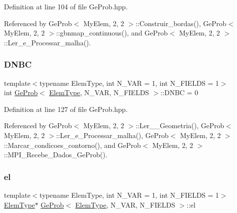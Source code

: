 Definition at line 104 of file Ge\+Prob.\+hpp.



Referenced by Ge\+Prob$<$ My\+Elem, 2, 2 $>$\+::\+Construir\+\_\+bordas(), Ge\+Prob$<$ My\+Elem, 2, 2 $>$\+::gbnmap\+\_\+continuous(), and Ge\+Prob$<$ My\+Elem, 2, 2 $>$\+::\+Ler\+\_\+e\+\_\+\+Processar\+\_\+malha().

\mbox{\label{classGeProb_a416b1ac091d91a8959a4ff2518948466}} 
\subsubsection{\texorpdfstring{D\+N\+BC}{DNBC}}
{\footnotesize\ttfamily template$<$typename Elem\+Type, int N\+\_\+\+V\+AR = 1, int N\+\_\+\+F\+I\+E\+L\+DS = 1$>$ \\
int \hyperlink{classGeProb}{Ge\+Prob}$<$ \hyperlink{spectral_8h_aaa2c1a7b2d1b12c590d730fe6ac839fa}{Elem\+Type}, N\+\_\+\+V\+AR, N\+\_\+\+F\+I\+E\+L\+DS $>$\+::D\+N\+BC = 0\hspace{0.3cm}{\ttfamily [protected]}}



Definition at line 127 of file Ge\+Prob.\+hpp.



Referenced by Ge\+Prob$<$ My\+Elem, 2, 2 $>$\+::\+Ler\+\_\+\+\_\+\+Geometria(), Ge\+Prob$<$ My\+Elem, 2, 2 $>$\+::\+Ler\+\_\+e\+\_\+\+Processar\+\_\+malha(), Ge\+Prob$<$ My\+Elem, 2, 2 $>$\+::\+Marcar\+\_\+condicoes\+\_\+contorno(), and Ge\+Prob$<$ My\+Elem, 2, 2 $>$\+::\+M\+P\+I\+\_\+\+Recebe\+\_\+\+Dados\+\_\+\+Ge\+Prob().

\mbox{\label{classGeProb_ac32127758c84295eb361466cf37afcac}} 
\subsubsection{\texorpdfstring{el}{el}}
{\footnotesize\ttfamily template$<$typename Elem\+Type, int N\+\_\+\+V\+AR = 1, int N\+\_\+\+F\+I\+E\+L\+DS = 1$>$ \\
\hyperlink{spectral_8h_aaa2c1a7b2d1b12c590d730fe6ac839fa}{Elem\+Type}$\ast$ \hyperlink{classGeProb}{Ge\+Prob}$<$ \hyperlink{spectral_8h_aaa2c1a7b2d1b12c590d730fe6ac839fa}{Elem\+Type}, N\+\_\+\+V\+AR, N\+\_\+\+F\+I\+E\+L\+DS $>$\+::el\hspace{0.3cm}{\ttfamily [protected]}}



